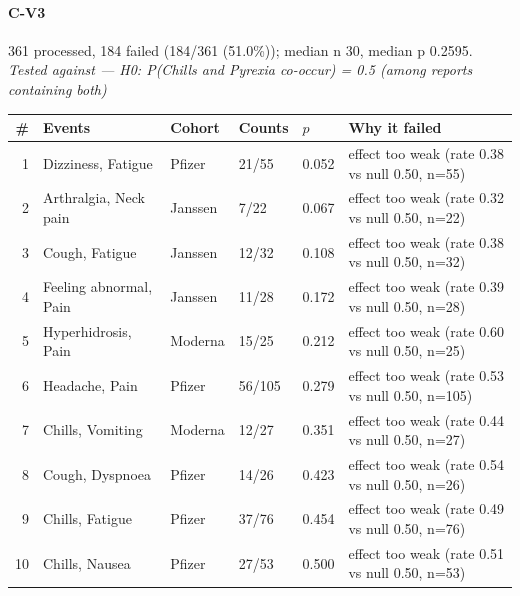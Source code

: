 \documentclass[11pt]{article}
\begin{document}
\paragraph{C-V3} 361 processed, 184 failed (184/361 (51.0\%)); median n 30, median p 0.2595. \emph{Tested against --- H0: P(Chills and Pyrexia co-occur) = 0.5 (among reports containing both)} \\
\begin{longtable}{@{}r p{3.9cm} p{2.5cm} l l p{4.4cm}@{}}
\toprule
\# & Events & Cohort & Counts & $p$ & Why it failed \\
\midrule \endhead
1 & Dizziness, Fatigue & Pfizer & 21/55 & 0.052 & effect too weak (rate 0.38 vs null 0.50, n=55) \\
2 & Arthralgia, Neck pain & Janssen & 7/22 & 0.067 & effect too weak (rate 0.32 vs null 0.50, n=22) \\
3 & Cough, Fatigue & Janssen & 12/32 & 0.108 & effect too weak (rate 0.38 vs null 0.50, n=32) \\
4 & Feeling abnormal, Pain & Janssen & 11/28 & 0.172 & effect too weak (rate 0.39 vs null 0.50, n=28) \\
5 & Hyperhidrosis, Pain & Moderna & 15/25 & 0.212 & effect too weak (rate 0.60 vs null 0.50, n=25) \\
6 & Headache, Pain & Pfizer & 56/105 & 0.279 & effect too weak (rate 0.53 vs null 0.50, n=105) \\
7 & Chills, Vomiting & Moderna & 12/27 & 0.351 & effect too weak (rate 0.44 vs null 0.50, n=27) \\
8 & Cough, Dyspnoea & Pfizer & 14/26 & 0.423 & effect too weak (rate 0.54 vs null 0.50, n=26) \\
9 & Chills, Fatigue & Pfizer & 37/76 & 0.454 & effect too weak (rate 0.49 vs null 0.50, n=76) \\
10 & Chills, Nausea & Pfizer & 27/53 & 0.500 & effect too weak (rate 0.51 vs null 0.50, n=53) \\
\bottomrule
\end{longtable}
\end{document}
